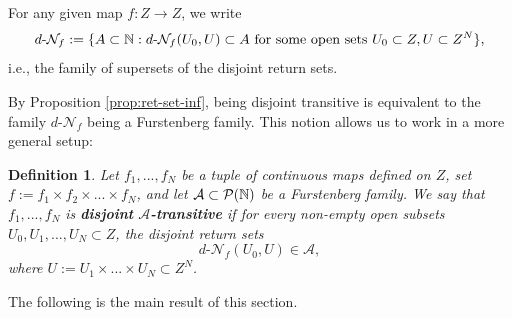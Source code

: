 \documentclass[11pt,reqno]{article}
\newtheorem{definition}[statement]{Definition}
\def\dret{d\text{-}\ret}
\def\ret{\mathcal{N}}
\def\NN{\Bbb N}
\begin{document}
For any given map $f\colon Z\to Z$, we write  
\begin{equation*}
    \dret_f:=\{A\subset \NN : \dret_f(U_0,U)\subset A \text{ for some open sets } U_0\subset Z, U\subset Z^N\},
\end{equation*}
i.e., the family of supersets of the disjoint return sets.

By Proposition \ref{prop:ret-set-inf}, being disjoint transitive is equivalent to the family $  d\text{-}\ret_f$ being a Furstenberg family. This notion allows us to work in a more general setup:



\begin{definition}\label{def:d-A-trans}
Let $f_1,...,f_N$ be a tuple of continuous maps defined on $Z$, set $f:= f_1 \times f_2 \times ...\times f_N$, and let $\mathcal{A}\subset \mathcal{P(\NN)}$ be a Furstenberg family. We say that $f_1,...,f_N$ is \textbf{disjoint} \textbf{$\boldsymbol{\mathcal{A}}$-transitive} if for every non-empty open subsets $U_0, U_1, ..., U_N \subset Z$,  the disjoint return sets
\begin{equation*}
\dret_f(U_0, U)\in  \mathcal{A}, 
\end{equation*}
where $U:=U_1 \times...\times U_N\subset Z^N$. 
\end{definition}

The following is the main result of this section.
\end{document}

